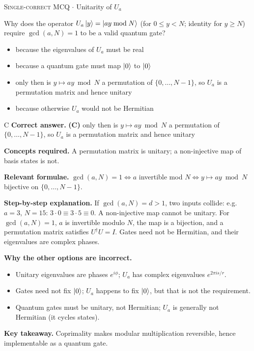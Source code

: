 \documentclass[11pt,a4paper]{article}
\newcommand{\optlabel}[1]{\textbf{(#1)}}
\newcommand{\correctlabel}[1]{\textcolor{okgreen}{\textbf{(#1)}\,\ding{51}}}
\newenvironment{qitem}[1]{\begin{list}{}{\setlength{\leftmargin}{3.3em}\setlength{\labelwidth}{3.1em}%
  \setlength{\labelsep}{0.2em}\setlength{\topsep}{3pt}\setlength{\parsep}{3pt}}\item[\textbf{Q.#1}\hfill]}{\end{list}}
\newcommand{\qsep}{\par\vspace{2pt}{\color{black!15}\hrule}\vspace{4pt}}
\newcommand{\qmeta}[2]{{\footnotesize\color{black!60}\textsc{#1} \;$\cdot$\; #2}\par}
\begin{document}
\begin{qitem}{23}
\qmeta{Single-correct MCQ}{Unitarity of $U_a$}
Why does the operator $U_a\ket y = \ket{ay \bmod N}$ (for $0 \le y < N$; identity for $y \ge N$) require $\gcd(a, N) = 1$ to be a valid quantum gate?
\begin{itemize}[leftmargin=2.6em, labelsep=0.4em, itemsep=2pt, topsep=3pt]
\item[\optlabel{A}] because the eigenvalues of $U_a$ must be real
\item[\optlabel{B}] because a quantum gate must map $\ket0$ to $\ket0$
\item[\correctlabel{C}] only then is $y \mapsto ay \bmod N$ a permutation of $\{0, \dots, N-1\}$, so $U_a$ is a permutation matrix and hence unitary
\item[\optlabel{D}] because otherwise $U_a$ would not be Hermitian
\end{itemize}
\end{qitem}
\begin{solbox}{C}
\textbf{\color{brand}Correct answer.} \textcolor{okgreen}{\textbf{(C)}} only then is $y \mapsto ay \bmod N$ a permutation of $\{0, \dots, N-1\}$, so $U_a$ is a permutation matrix and hence unitary

\textbf{\color{brand}Concepts required.} A permutation matrix is unitary; a non-injective map of basis states is not.

\textbf{\color{brand}Relevant formulae.} $\gcd(a, N) = 1 \iff a$ invertible mod $N \iff y \mapsto ay \bmod N$ bijective on $\{0, \dots, N-1\}$.

\textbf{\color{brand}Step-by-step explanation.} If $\gcd(a, N) = d > 1$, two inputs collide: e.g.\ $a = 3$, $N = 15$: $3\cdot0 \equiv 3\cdot5 \equiv 0$. A non-injective map cannot be unitary.
For $\gcd(a, N) = 1$, $a$ is invertible modulo $N$, the map is a bijection, and a permutation matrix satisfies $U^\dagger U = I$. Gates need not be
Hermitian, and their eigenvalues are complex phases.

\textbf{\color{brand}Why the other options are incorrect.}
\begin{itemize}[leftmargin=2.4em, itemsep=1pt, topsep=2pt]
\item[\textbf{(A)}] Unitary eigenvalues are phases $e^{i\phi}$; $U_a$ has complex eigenvalues $e^{2\pi is/r}$.
\item[\textbf{(B)}] Gates need not fix $\ket0$; $U_a$ happens to fix $\ket0$, but that is not the requirement.
\item[\textbf{(D)}] Quantum gates must be unitary, not Hermitian; $U_a$ is generally not Hermitian (it cycles states).
\end{itemize}
\textbf{\color{brand}Key takeaway.} Coprimality makes modular multiplication reversible, hence implementable as a quantum gate.
\end{solbox}
\qsep
\end{document}
